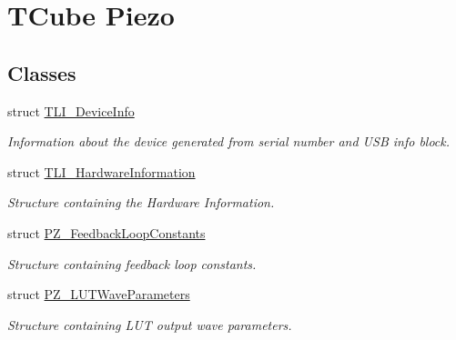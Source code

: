 \hypertarget{group___t_cube_piezo}{}\section{T\+Cube Piezo}
\label{group___t_cube_piezo}
\subsection*{Classes}
\begin{DoxyCompactItemize}
\item 
struct \hyperlink{struct_t_l_i___device_info}{T\+L\+I\+\_\+\+Device\+Info}
\begin{DoxyCompactList}\small\item\em Information about the device generated from serial number and U\+SB info block. \end{DoxyCompactList}\item 
struct \hyperlink{struct_t_l_i___hardware_information}{T\+L\+I\+\_\+\+Hardware\+Information}
\begin{DoxyCompactList}\small\item\em Structure containing the Hardware Information. \end{DoxyCompactList}\item 
struct \hyperlink{struct_p_z___feedback_loop_constants}{P\+Z\+\_\+\+Feedback\+Loop\+Constants}
\begin{DoxyCompactList}\small\item\em Structure containing feedback loop constants. \end{DoxyCompactList}\item 
struct \hyperlink{struct_p_z___l_u_t_wave_parameters}{P\+Z\+\_\+\+L\+U\+T\+Wave\+Parameters}
\begin{DoxyCompactList}\small\item\em Structure containing L\+UT output wave parameters. \end{DoxyCompactList}\end{DoxyCompactItemize}
